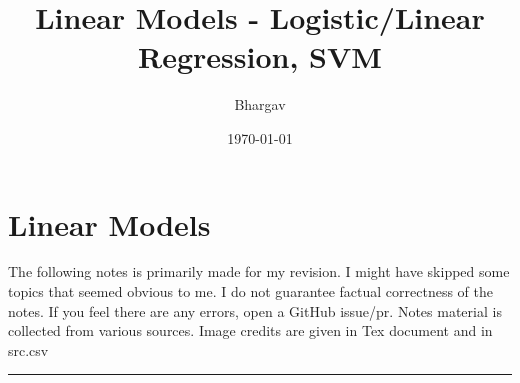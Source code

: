 \documentclass[	DIV=calc,%
paper=a4,%
fontsize=11pt,%
twocolumn]{scrartcl} %
\title{Linear Models - Logistic/Linear Regression, SVM} %
\author{Bhargav} %
\date{\today} %
\newcommand{\hformbar}[1]{\vspace{5pt}\hrule\vspace{10pt}} %
\newcommand{\initial}[1]{%
	\lettrine[lines=3,lhang=0.3,nindent=0em]{
		\color{DarkGoldenrod}
		{\textsf{#1}}}{}}
\newcommand{\formdesc}[1]{\noindent\textbf{#1}}
\begin{document}
	\maketitle
	\thispagestyle{fancy} 	%
	\section{Linear Models}
	
	\footnotesize{The following notes is primarily made for my revision. I might have skipped some topics that seemed obvious to me. I do not guarantee factual correctness of the notes. If you feel there are any errors, open a GitHub issue/pr. Notes material is collected from various sources. Image credits are given in Tex document and in src.csv}
	
	\hspace{10pt}

\hformbar
\formdesc{Logistic Regression:}
\end{document}
